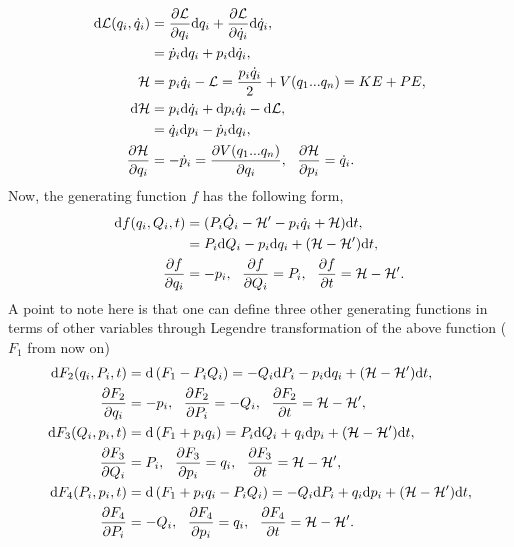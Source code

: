 \documentclass[a4paper]{article}
\begin{document}
\begin{equation}
\begin{split}
{\rm d}\mathcal{L}(q_{i},\dot{q}_{i})&=\frac{\partial \mathcal{L}}{\partial q_{i}} {\rm d}q_{i}+\frac{\partial \mathcal{L}}{\partial \dot{q}_{i}} {\rm d}\dot{q}_{i},\\
&=\dot{p}_{i} {\rm d}q_{i}+p_{i} {\rm d}\dot{q}_{i},\\
\mathcal{H}&=p_{i}\dot{q}_{i}-\mathcal{L}=\frac{p_{i}\dot{q}_{i}}{2} + V(q_{1}...q_{n})=KE+PE,\\
{\rm d}\mathcal{H}&=p_{i}{\rm d}\dot{q}_{i}+{\rm d}p_{i} \dot{q}_{i}-{\rm d}\mathcal{L},\\
&=\dot{q}_{i}{\rm d}p_{i}- \dot{p}_{i}{\rm d}q_{i},\\
\frac{\partial \mathcal{H}}{\partial q_{i}}&=-\dot{p}_{i}=\frac{\partial V(q_{1}...q_{n})}{\partial q_{i}},~~\frac{\partial \mathcal{H}}{\partial p_{i}}=\dot{q}_{i}.\\
\end{split}
\end{equation}
Now, the generating function $f$ has the following form,
\begin{equation}\label{eq:generatingfunction}
\begin{split}
{\rm d}f(q_{i},Q_{i},t)&=(P_{i}\dot{Q}_{i}-\mathcal{H}^{\prime}-p_{i}\dot{q}_{i}+\mathcal{H}){\rm d}t,\\
&=P_{i}{\rm d}Q_{i}-p_{i}{\rm d}q_{i}+(\mathcal{H}-\mathcal{H}^{\prime}){\rm d}t,\\
\frac{\partial f}{\partial q_{i}}&=-p_{i},~~\frac{\partial f}{\partial Q_{i}}=P_{i},~~\frac{\partial f}{\partial t}=\mathcal{H}-\mathcal{H}^{\prime}.
\end{split}
\end{equation}
A point to note here is that one can define three other generating functions in terms of other variables through Legendre transformation of the above function ($F_{1}$ from now on)
\begin{equation}\label{eq:generatingfunctions}
\begin{split}
{\rm d}F_{2}(q_{i}, P_{i},t)&={\rm d}\left(F_{1}-P_{i}Q_{i}\right)=-Q_{i}{\rm d}P_{i}-p_{i}{\rm d}q_{i}+(\mathcal{H}-\mathcal{H}^{\prime}){\rm d}t,\\
\frac{\partial F_{2}}{\partial q_{i}}&=-p_{i},~~\frac{\partial F_{2}}{\partial P_{i}}=-Q_{i},~~\frac{\partial F_{2}}{\partial t}=\mathcal{H}-\mathcal{H}^{\prime},\\
{\rm d}F_{3}(Q_{i}, p_{i},t)&={\rm d}\left(F_{1}+p_{i}q_{i}\right)=P_{i}{\rm d}Q_{i}+q_{i}{\rm d}p_{i}+(\mathcal{H}-\mathcal{H}^{\prime}){\rm d}t,\\
\frac{\partial F_{3}}{\partial Q_{i}}&=P_{i},~~\frac{\partial F_{3}}{\partial p_{i}}=q_{i},~~\frac{\partial F_{3}}{\partial t}=\mathcal{H}-\mathcal{H}^{\prime},\\
{\rm d}F_{4}(P_{i}, p_{i},t)&={\rm d}\left(F_{1}+p_{i}q_{i}-P_{i}Q_{i}\right)=-Q_{i}{\rm d}P_{i}+q_{i}{\rm d}p_{i}+(\mathcal{H}-\mathcal{H}^{\prime}){\rm d}t,\\
\frac{\partial F_{4}}{\partial P_{i}}&=-Q_{i},~~\frac{\partial F_{4}}{\partial p_{i}}=q_{i},~~\frac{\partial F_{4}}{\partial t}=\mathcal{H}-\mathcal{H}^{\prime}.
\end{split}
\end{equation} 
\end{document}
